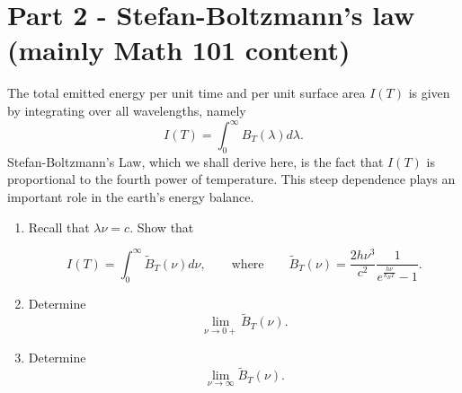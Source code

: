 \documentclass{exam}
\begin{document}
\section*{Part 2 - Stefan-Boltzmann's law (mainly Math 101 content)}
The total emitted energy per unit time and per unit surface area $I(T)$ is given by integrating over all wavelengths, namely $$I(T)= \int_0^\infty B_T(\lambda)d\lambda.$$ Stefan-Boltzmann's Law, which we shall derive here, is the fact that $I(T)$ is proportional to the fourth power of temperature. This steep dependence plays an important role in the earth's energy balance.
\begin{enumerate}

        \item Recall that $\lambda \nu = c$. Show that
    
        $$
        I(T) = \int_0^\infty \tilde B_T(\nu)d \nu,\qquad \text{where}\qquad\tilde{B}_T(\nu)=\frac{2h \nu^3}{c^2} \frac{1}{e^{\frac{h \nu}{k_B T}}-1}.
        $$



        \item Determine  $$\lim_{\nu \to 0+}\tilde{B}_T(\nu).$$ 

 
        \item Determine  $$\lim_{\nu \to \infty}\tilde{B}_T(\nu).$$

        
\end{enumerate}
\end{document}
